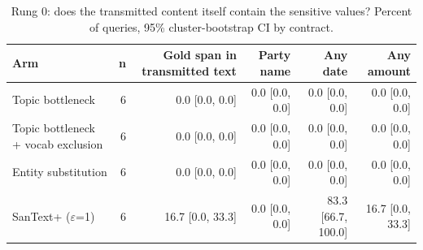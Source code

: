 \begin{table}[t]
\centering\small
\caption{Rung 0: does the transmitted content itself contain the sensitive values? Percent of queries, 95\% cluster-bootstrap CI by contract.}
\label{tab:leak}
\begin{tabular}{lrrrrr}
\toprule
Arm & n & Gold span in transmitted text & Party name & Any date & Any amount \\
\midrule
Topic bottleneck & 6 & 0.0 [0.0, 0.0] & 0.0 [0.0, 0.0] & 0.0 [0.0, 0.0] & 0.0 [0.0, 0.0] \\
Topic bottleneck + vocab exclusion & 6 & 0.0 [0.0, 0.0] & 0.0 [0.0, 0.0] & 0.0 [0.0, 0.0] & 0.0 [0.0, 0.0] \\
Entity substitution & 6 & 0.0 [0.0, 0.0] & 0.0 [0.0, 0.0] & 0.0 [0.0, 0.0] & 0.0 [0.0, 0.0] \\
SanText+ ($\varepsilon$=1) & 6 & 16.7 [0.0, 33.3] & 0.0 [0.0, 0.0] & 83.3 [66.7, 100.0] & 16.7 [0.0, 33.3] \\
\bottomrule
\end{tabular}
\end{table}

